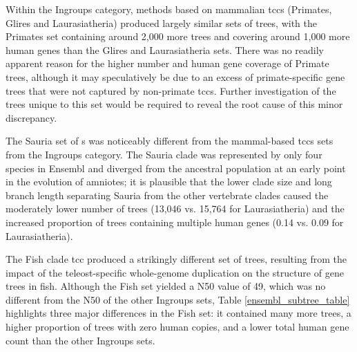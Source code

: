Within the Ingroups category, methods based on mammalian \acp{tcc}
(Primates, Glires and Laurasiatheria) produced largely similar sets of
trees, with the Primates set containing around 2,000 more trees and
covering around 1,000 more human genes than the Glires and
Laurasiatheria sets. There was no readily apparent reason for the
higher number and human gene coverage of Primate trees, although it
may speculatively be due to an excess of primate-specific gene trees
that were not captured by non-primate \acp{tcc}. Further investigation
of the trees unique to this set would be required to reveal the root
cause of this minor discrepancy.

The Sauria set of \subtr{}s was noticeably different from the
mammal-based \acp{tcc} sets from the Ingroups category. The Sauria
clade was represented by only four species in Ensembl and diverged
from the \mammln ancestral population at an early point in the
evolution of amniotes; it is plausible that the lower clade size and
long branch length separating Sauria from the other vertebrate clades
caused the moderately lower number of trees (13,046 vs. 15,764 for
Laurasiatheria) and the increased proportion of trees containing
multiple human genes (0.14 vs. 0.09 for Laurasiatheria).

The Fish clade \ac{tcc} produced a strikingly different set of trees,
resulting from the impact of the teleost-specific whole-genome
duplication on the structure of gene trees in fish. Although the Fish
\subtr set yielded a N50 value of 49, which was no different from the
N50 of the other Ingroups sets, Table \ref{ensembl_subtree_table}
highlights three major differences in the Fish set: it contained many
more trees, a higher proportion of trees with zero human copies, and a
lower total human gene count than the other Ingroups sets.

